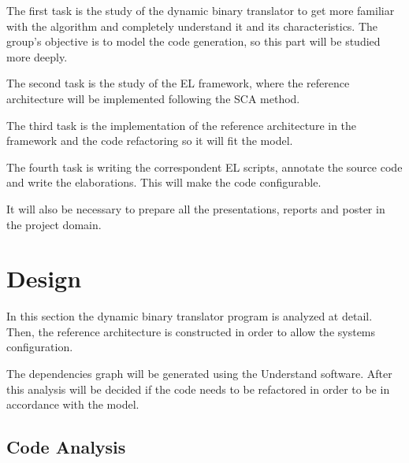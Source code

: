 \documentclass{report}
\begin{document}
	\par The first task is the study of the dynamic binary translator to get more familiar with the algorithm and completely understand it and its characteristics. The group's objective is to model the code generation, so this part will be studied more deeply.
	\par The second task is the study of the EL framework, where the reference architecture will be implemented following the SCA method.
	\par The third task is the implementation of the reference architecture in the framework and the code refactoring so it will fit the model. 
	\par The fourth task is writing the correspondent EL scripts, annotate the source code and write the elaborations. This will make the code configurable.
	\par It will also be necessary to prepare all the presentations, reports and poster in the project domain.



\chapter{Design}

	\par In this section the dynamic binary translator program is analyzed at detail. Then, the reference architecture is constructed in order to allow the systems configuration. 
	\par The dependencies graph will be generated using the Understand software. After this analysis will be decided if the code needs to be refactored in order to be in accordance with the model. 
	
	\section{Code Analysis}
	
\end{document}
